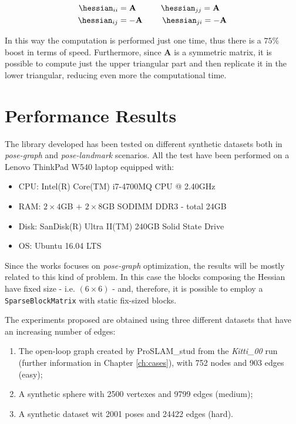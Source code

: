 \begin{align*}
    \hessian_{ii} &= \mathbf{A} \quad\qquad
    \hessian_{jj} = \mathbf{A} \\
    \hessian_{ij} &= -\mathbf{A} \:\,\qquad
    \hessian_{ji} = -\mathbf{A}
\end{align*}

\noindent In this way the computation is performed just one time, thus there is a $75\%$ boost in terms of speed. Furthermore, since $\mathbf{A}$ is a symmetric matrix, it is possible to compute just the upper triangular part and then replicate it in the lower triangular, reducing even more the computational time.

\section{Performance Results}\label{sec:performance_results}
The library developed has been tested on different synthetic datasets both in \textit{pose-graph} and \textit{pose-landmark} scenarios. All the test have been performed on a Lenovo ThinkPad W540 laptop equipped with:

\begin{itemize}
    \item CPU: Intel(R) Core(TM) i7-4700MQ CPU @ 2.40GHz
    \item RAM: $2 \times 4$GB $+$ $2\times8$GB SODIMM DDR3 - total 24GB
    \item Disk: SanDisk(R) Ultra II(TM) 240GB Solid State Drive
    \item OS: Ubuntu 16.04 LTS
\end{itemize}

Since the works focuses on \textit{pose-graph} optimization, the results will be mostly related to this kind of problem. In this case the blocks composing the Hessian have fixed size - i.e. $(6\times6)$ - and, therefore, it is possible to employ a \texttt{SparseBlockMatrix} with static fix-sized blocks. 

The experiments proposed are obtained using three different datasets that have an increasing number of edges:

\begin{enumerate}
    \item The open-loop graph created by ProSLAM\_stud from the \textit{Kitti\_00} run (further information in Chapter \ref{ch:cases}), with 752 nodes and 903 edges (easy);
    \item A synthetic sphere with 2500 vertexes and 9799 edges (medium);
    \item A synthetic dataset wit 2001 poses and 24422 edges (hard).
\end{enumerate}

